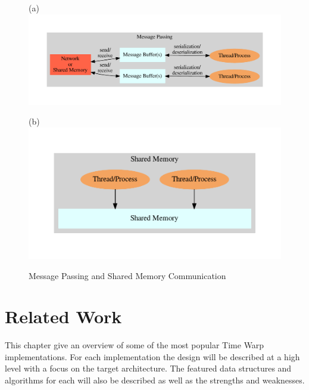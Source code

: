 \documentclass[11pt]{book}
\begin{document}
\begin{figure}
  \begin{minipage}{.5\textwidth}
    \begin{center}
      (a)
      \includegraphics[width=\textwidth,keepaspectratio,quiet]{figs/graphviz/message_passing.pdf}
    \end{center}  
  \end{minipage}%
  \hfill
  \begin{minipage}{.5\textwidth}
    \begin{center}
      (b) 
      \includegraphics[width=\textwidth,keepaspectratio,quiet]{figs/graphviz/shared_memory.pdf}
    \end{center}  
  \end{minipage}
  \caption{Message Passing and Shared Memory Communication}\label{communication}
\end{figure}



\chapter{Related Work}\label{related_work}

This chapter give an overview of some of the most popular Time Warp implementations.  For each
implementation the design will be described at a high level with a focus on the target architecture.
The featured data structures and algorithms for each will also be described as well as the strengths
and weaknesses.
\end{document}
